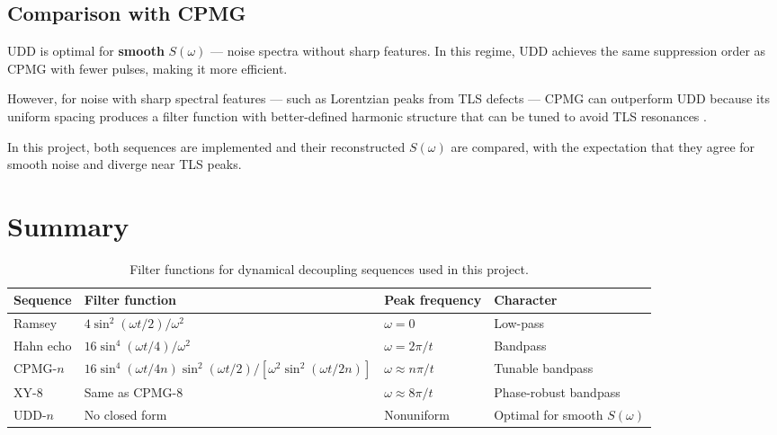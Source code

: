 \documentclass[12pt]{article}
\begin{document}
\subsection*{Comparison with CPMG}

UDD is optimal for \textbf{smooth} $S(\omega)$ — noise spectra without sharp features. In this regime, UDD achieves the same suppression order as CPMG with fewer pulses, making it more efficient.

However, for noise with sharp spectral features — such as Lorentzian peaks from TLS defects — CPMG can outperform UDD because its uniform spacing produces a filter function with better-defined harmonic structure that can be tuned to avoid TLS resonances \cite{Cywinski2008}.

In this project, both sequences are implemented and their reconstructed $S(\omega)$ are compared, with the expectation that they agree for smooth noise and diverge near TLS peaks.

\section{Summary}

\begin{table}[h]
\centering
\begin{tabular}{llll}
\hline
\textbf{Sequence} & \textbf{Filter function} & \textbf{Peak frequency} & \textbf{Character} \\
\hline
Ramsey      & $4\sin^2(\omega t/2)/\omega^2$   & $\omega = 0$       & Low-pass \\
Hahn echo   & $16\sin^4(\omega t/4)/\omega^2$  & $\omega = 2\pi/t$  & Bandpass \\
CPMG-$n$    & $16\sin^4(\omega t/4n)\sin^2(\omega t/2) / [\omega^2\sin^2(\omega t/2n)]$ & $\omega \approx n\pi/t$ & Tunable bandpass \\
XY-8        & Same as CPMG-8                                                            & $\omega \approx 8\pi/t$ & Phase-robust bandpass \\
UDD-$n$     & No closed form                              & Nonuniform         & Optimal for smooth $S(\omega)$ \\
\hline
\end{tabular}
\caption{Filter functions for dynamical decoupling sequences used in this project.}
\end{table}
\end{document}
